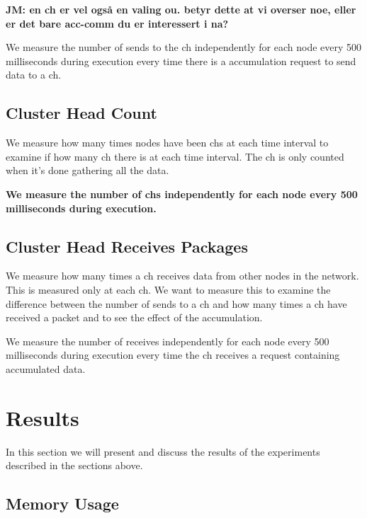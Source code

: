 \documentclass[USenglish]{uit-thesis}
\begin{document}
\textbf{JM: en ch er vel også en valing ou. betyr dette at vi overser noe, eller er det bare acc-comm du er interessert i na?}

We measure the number of sends to the \gls{ch} independently for each node every 500 milliseconds during execution every time there is a accumulation request to send data to a \gls{ch}.


\subsection{Cluster Head Count} \label{eva:ch_count}
We measure how many times nodes have been \gls{ch}s at each time interval to examine if how many \gls{ch} there is at each time interval. The \gls{ch} is only counted when it's done gathering all the data.

\textbf{We measure the number of \glspl{ch} independently for each node every 500 milliseconds during execution.}



\subsection{Cluster Head Receives Packages} \label{eva:ch_recv}
We measure how many times a \gls{ch} receives data from other nodes in the network. This is measured only at each \gls{ch}. We want to measure this to examine the difference between the number of sends to a \gls{ch} and how many times a \gls{ch} have received a packet and to see the effect of the accumulation.


We measure the number of receives independently for each node every 500 milliseconds during execution every time the \gls{ch} receives a request containing accumulated data.


\newpage

\section{Results}

In this section we will present and discuss the results of the experiments described in the sections above.

\subsection{Memory Usage}
\end{document}
